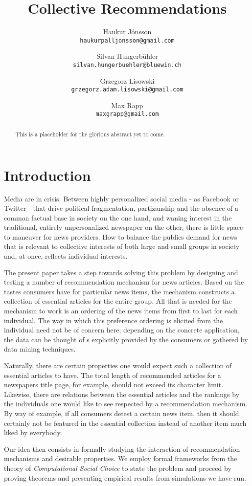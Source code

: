 \documentclass{article}
\title{Collective Recommendations}
\author{
    Haukur J{\'o}nsson \\    \texttt{haukurpalljonsson@gmail.com}\\
    \and
    Silvan Hungerb{\"u}hler \\   \texttt{silvan.hungerbuehler@bluewin.ch}\\
    \and
    Grzegorz Lisowski \\  \texttt{grzegorz.adam.lisowski@gmail.com}\\
    \and
    Max Rapp \\  \texttt{maxgrapp@gmail.com}
}
\begin{document}
\maketitle

\begin{abstract}
This is a placeholder for the glorious abstract yet to come.
\end{abstract}

\section{Introduction}\label{introduction}
Media are in crisis. Between highly personalized social media - as Facebook or Twitter - that drive political 
fragmentation, partizanship and the absence of a common factual base in society on the one hand, 
and waning interest in the traditional, entirely unpersonalized newspaper on the other, there is little space to maneuver for news providers. 
 How to balance the publics demand for news that is relevant to collective interests of both large and small groups in society and, at once, 
 reflects individual interests.
 
The present paper takes a step towards solving this problem by designing and testing a number of recommendation mechanism for news articles. 
 Based on the tastes consumers have for particular news items, the mechanism constructs a collection of essential articles for the entire group. 
 All that is needed for the mechanism to work is an ordering of the news items from first to last for each individual. 
 The way in which this preference ordering is elicited from the individual need not be of concern here; 
 depending on the concrete application, the data can be thought of s explicitly provided by the consumers or gathered by data mining techniques.
 
 Naturally, there are certain properties one would expect such a collection of essential articles to have. 
 The total length of recommended articles for a newspapers title page, for example, should not exceed its character limit. 
 Likewise, there are relations between the essential articles and the rankings by the individuals one would like to see respected by a recommendation mechanism. 
 By way of example, if all consumers detest a certain news item, 
 then it should certainly not be featured in the essential collection instead of another item much liked by everybody.
 
Our idea then consists in formally studying the interaction of recommendation mechanisms and desirable properties. 
We employ formal frameworks from the theory of \emph{Computational Social Choice} to state the problem
and proceed by proving theorems and presenting empirical results from simulations we have run.  
\end{document}
